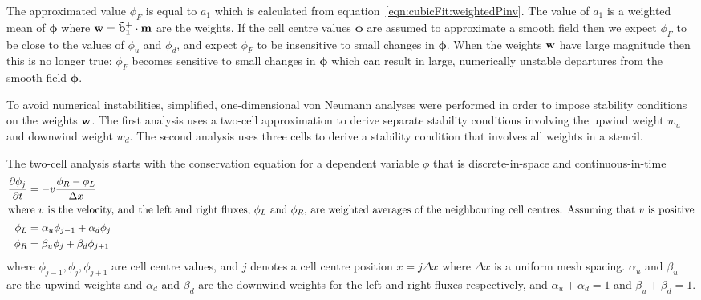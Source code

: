 The approximated value $\phi_F$ is equal to $a_1$ which is calculated from equation~\eqref{eqn:cubicFit:weightedPinv}.  The value of $a_1$ is a weighted mean of $\bm{\phi}$ where $\mathbf{w} = \mathbf{\tilde{b}_1^+} \cdot \mathbf{m}$ are the weights.
If the cell centre values $\bm{\phi}$ are assumed to approximate a smooth field then we expect $\phi_F$ to be close to the values of $\phi_u$ and $\phi_d$, and expect $\phi_F$ to be insensitive to small changes in $\bm{\phi}$.
When the weights $\mathbf{w}$ have large magnitude then this is no longer true: $\phi_F$ becomes sensitive to small changes in $\bm{\phi}$ which can result in large, numerically unstable departures from the smooth field $\bm{\phi}$.

To avoid numerical instabilities, simplified, one-dimensional von Neumann analyses were performed in order to impose stability conditions on the weights $\mathbf{w}$.
The first analysis uses a two-cell approximation to derive separate stability conditions involving the upwind weight $w_u$ and downwind weight $w_d$.  The second analysis uses three cells to derive a stability condition that involves all weights in a stencil.

The two-cell analysis starts with the conservation equation for a dependent variable $\phi$ that is discrete-in-space and continuous-in-time
\begin{align}
\frac{\partial \phi_j}{\partial t} &= - v \frac{\phi_R - \phi_L}{\Delta x} \label{eqn:vonNeumann:advectionLR} \\
%
\intertext{where $v$ is the velocity, and the left and right fluxes, $\phi_L$ and $\phi_R$, are weighted averages of the neighbouring cell centres.  Assuming that $v$ is positive}
%
\phi_L &= \alpha_u \phi_{j-1} + \alpha_d \phi_j \\
\phi_R &= \beta_u \phi_j + \beta_d \phi_{j+1}
\end{align}
where $\phi_{j-1}, \phi_j, \phi_{j+1}$ are cell centre values, and $j$ denotes a cell centre position $x = j \Delta x$ where $\Delta x$ is a uniform mesh spacing.
$\alpha_u$ and $\beta_u$ are the upwind weights and $\alpha_d$ and $\beta_d$ are the downwind weights for the left and right fluxes respectively, and $\alpha_u + \alpha_d = 1$ and $\beta_u + \beta_d = 1$.


